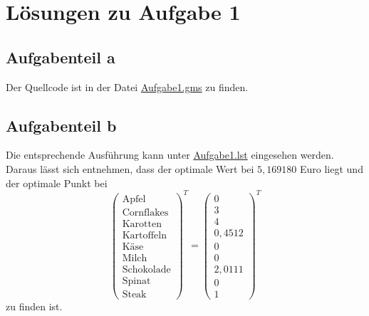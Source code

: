 \documentclass[a4paper,12pt]{article}
\begin{document}
\newpage

\section*{L\"osungen zu Aufgabe 1}

\subsection*{Aufgabenteil a}

Der Quellcode ist in der Datei \href{../src/r1/Aufgabe1.gms}{Aufgabe1.gms} zu finden.

\subsection*{Aufgabenteil b}

Die entsprechende Ausf\"uhrung kann unter \href{../results/r1/Aufgabe1.lst}{Aufgabe1.lst} eingesehen werden. Daraus l\"asst sich entnehmen, dass der optimale Wert bei $5,169180$ Euro liegt und der optimale Punkt bei
\[
\begin{pmatrix}
\text{Apfel} \\ 
\text{Cornflakes} \\ 
\text{Karotten} \\ 
\text{Kartoffeln} \\ 
\text{K\"ase} \\ 
\text{Milch} \\ 
\text{Schokolade} \\ 
\text{Spinat} \\ 
\text{Steak}
\end{pmatrix}^T
=
\begin{pmatrix}
0 \\ 
3 \\ 
4 \\ 
0,4512 \\ 
0 \\ 
0 \\ 
2,0111 \\
0 \\
1
\end{pmatrix}^T
\]
zu finden ist.

\newpage
\end{document}
